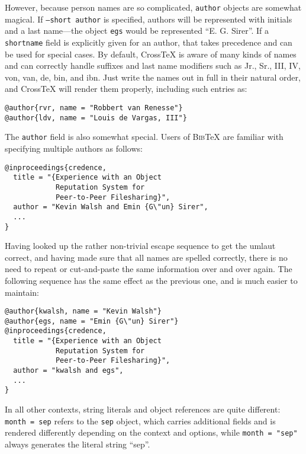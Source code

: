 \documentclass{article}
\newcommand{\XTeX}{Cross\TeX}
\newcommand{\BibTeX}{\textsc{Bib}\TeX}
\begin{document}
However, because person names are so complicated, \texttt{author} objects are somewhat magical. If \texttt{--short author} is specified, authors will be represented with initials and a last name---the object \texttt{egs} would be represented ``E. G. Sirer''. If a \texttt{shortname} field is explicitly given for an author, that takes precedence and can be used for special cases. 
By default, \XTeX{} is aware of many kinds of names and can correctly handle suffixes and last name modifiers such as Jr., Sr., III, IV, von, van, de, bin, and ibn. Just write the names out in full in their natural order, and \XTeX{} will render them properly, including such entries as:

\begin{small}\begin{verbatim}
@author{rvr, name = "Robbert van Renesse"}
@author{ldv, name = "Louis de Vargas, III"}
\end{verbatim}\end{small}

The \texttt{author} field is also somewhat special. Users of \BibTeX{} are familiar with specifying multiple authors as follows:

\begin{small}\begin{verbatim}
@inproceedings{credence,
  title = "{Experience with an Object
            Reputation System for 
            Peer-to-Peer Filesharing}",
  author = "Kevin Walsh and Emin {G\"un} Sirer",
  ...
}
\end{verbatim}\end{small}

Having looked up the rather non-trivial escape sequence to get the umlaut 
correct, and having made sure that all names are spelled correctly, there
is no need to repeat or cut-and-paste the same information over and over
again. The following sequence has the same effect as the previous one, 
and is much easier to maintain:


\begin{small}\begin{verbatim}
@author{kwalsh, name = "Kevin Walsh"}
@author{egs, name = "Emin {G\"un} Sirer"}
@inproceedings{credence,
  title = "{Experience with an Object
            Reputation System for 
            Peer-to-Peer Filesharing}",
  author = "kwalsh and egs",
  ...
}
\end{verbatim}\end{small}

In all other contexts, string literals and object references are quite different: \texttt{month = sep} refers to the \texttt{sep} object, which carries additional fields and is rendered differently depending on the context and options, while \texttt{month = "sep"} always generates the literal string ``sep''.
\end{document}
